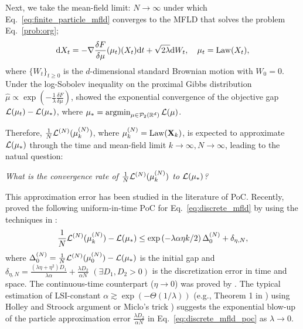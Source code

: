 Next, we take the mean-field limit: $N\to \infty$ under which Eq.~\eqref{eq:finite_particle_mfld} converges to the MFLD that solves the problem Eq.~\eqref{prob:org}; 
\begin{equation}\label{eq:mfld}
    \mathrm{d} X_t = - \nabla \frac{\delta F}{\delta \mu}(\mu_t)(X_t)\mathrm{d} t + \sqrt{2\lambda}\mathrm{d} W_t,~~~\mu_t = \mathrm{Law}(X_t),
\end{equation}
where $\{W_t\}_{t\geq 0}$ is the $d$-dimensional standard Brownian motion with $W_0=0$. Under the log-Sobolev inequality on the proximal Gibbs distribution $\hat{\mu} \propto \exp\left(-\frac{1}{\lambda}\frac{\delta F}{\delta \mu}\right)$, \citet{nitanda2022convex,chizat2022mean} showed the exponential convergence of the objective gap $\mathcal{L}(\mu_t) - \mathcal{L}(\mu_*)$, where $\mu_* = \mathop{\mathrm{argmin}}_{\mu \in \mathcal{P}_2(\mathbb{R}^d)}\mathcal{L}(\mu)$. 

Therefore, $\frac{1}{N}\pow[\cL,N](\pow[\mu,N]_k)$, where $\pow[\mu,N]_k=\mathrm{Law}(\vX_k)$, is expected to approximate $\mathcal{L}(\mu_*)$ through the time and mean-field limit $k \to \infty, N \to \infty$, leading to the natual question: 
\vspace{-1mm}
\begin{center}
{\it What is the convergence rate of $\frac{1}{N}\pow[\cL,N](\pow[\mu,N]_k)$ to $\mathcal{L}(\mu_*)$?}
\end{center}
\vspace{-1mm}
This approximation error has been studied in the literature of PoC. Recently, \citet{suzuki2023convergence} proved the following uniform-in-time PoC for Eq.~\eqref{eq:discrete_mfld} by using the techniques in \citet{chen2022uniform}:
\begin{align}\label{eq:discrete_mfld_poc}
    \frac{1}{N}\pow[\cL,N]( \pow[\mu,N]_k) - \cL(\mu_*) 
    \leq \exp\left(-\lambda\alpha \eta k/2\right)\pow[\Delta,N]_0 + \delta_{\eta,N},  
\end{align}
where $\pow[\Delta,N]_0 = \frac{1}{N}\pow[\cL,N]( \pow[\mu,N]_0) - \cL(\mu_*)$ is the initial gap and $\delta_{\eta,N}=\frac{(\lambda \eta + \eta^2)D_1}{\lambda \alpha} + \frac{\lambda D_2}{\alpha N}$ $(\exists D_1,D_2 > 0)$ is the discretization error in time and space.
The continuous-time counterpart ($\eta \to 0$) was proved by \citet{chen2022uniform}. 
The typical estimation of LSI-constant $\alpha \gtrsim \exp(-\Theta(1/\lambda))$ (e.g., Theorem 1 in \citet{suzuki2023convergence}) using Holley and Stroock argument \citep{holley1987logarithmic} or Miclo's trick \citep{bardet2018}) suggests the exponential blow-up of the particle approximation error $\frac{\lambda D_2}{\alpha N}$ in Eq.~\eqref{eq:discrete_mfld_poc} as $\lambda \to 0$.

